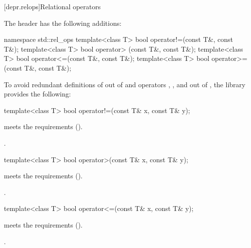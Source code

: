 [depr.relops]{Relational operators}%
%

\pnum
The header  has the following additions:

\begin{codeblock}
namespace std::rel_ops {
  template<class T> bool operator!=(const T&, const T&);
  template<class T> bool operator> (const T&, const T&);
  template<class T> bool operator<=(const T&, const T&);
  template<class T> bool operator>=(const T&, const T&);
}
\end{codeblock}

\pnum
To avoid redundant definitions of  out of 
and operators \tcode{>}, \tcode{<=}, and \tcode{>=} out of ,
the library provides the following:

%
\begin{itemdecl}
template<class T> bool operator!=(const T& x, const T& y);
\end{itemdecl}

\begin{itemdescr}
\pnum
\expects
{} meets the  requirements ().

\pnum
\returns
{}.
\end{itemdescr}

%
\begin{itemdecl}
template<class T> bool operator>(const T& x, const T& y);
\end{itemdecl}

\begin{itemdescr}
\pnum
\expects
{} meets the  requirements ().

\pnum
\returns
{}.
\end{itemdescr}

%
\begin{itemdecl}
template<class T> bool operator<=(const T& x, const T& y);
\end{itemdecl}

\begin{itemdescr}
\pnum
\expects
{} meets the  requirements ().

\pnum
\returns
{}.
\end{itemdescr}

